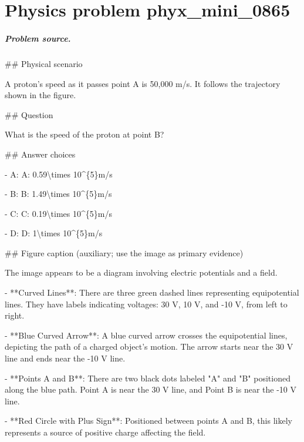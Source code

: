 
\chapter{Physics problem phyx\_mini\_0865}
\label{ch:PhyXMiniProblems_problem_phyx_mini_0865}

\paragraph{Problem source.}
\#\# Physical scenario

A proton’s speed as it passes point A is 50,000 m/s. It follows the trajectory shown in the figure.

\#\# Question

What is the speed of the proton at point B?

\#\# Answer choices

- A: A: 0.59\textbackslash{}times 10\textasciicircum{}\{5\}m/s

- B: B: 1.49\textbackslash{}times 10\textasciicircum{}\{5\}m/s

- C: C: 0.19\textbackslash{}times 10\textasciicircum{}\{5\}m/s

- D: D: 1\textbackslash{}times 10\textasciicircum{}\{5\}m/s

\#\# Figure caption (auxiliary; use the image as primary evidence)

The image appears to be a diagram involving electric potentials and a field.

- **Curved Lines**: There are three green dashed lines representing equipotential lines. They have labels indicating voltages: 30 V, 10 V, and -10 V, from left to right.

- **Blue Curved Arrow**: A blue curved arrow crosses the equipotential lines, depicting the path of a charged object's motion. The arrow starts near the 30 V line and ends near the -10 V line.

- **Points A and B**: There are two black dots labeled "A" and "B" positioned along the blue path. Point A is near the 30 V line, and Point B is near the -10 V line.

- **Red Circle with Plus Sign**: Positioned between points A and B, this likely represents a source of positive charge affecting the field.

